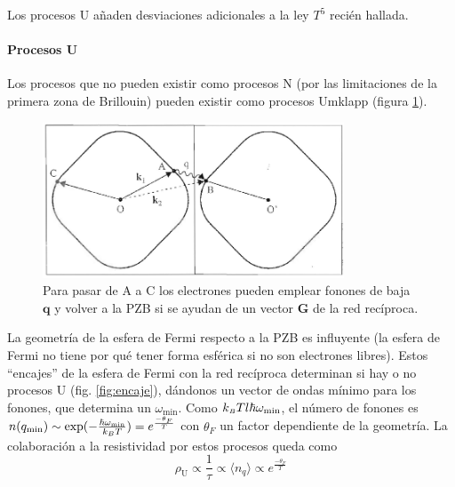 Los procesos U añaden desviaciones adicionales a la ley $T^5$ recién
hallada.

\paragraph{Procesos U}
Los procesos que no pueden existir como procesos N (por las
limitaciones de la primera zona de Brillouin) pueden existir como
procesos Umklapp (figura \ref{fig:uprocess}).

\begin{figure}
  \centering
  \includegraphics[width=0.8\textwidth]{figures/uprocess.png}
  \caption{Para pasar de A a C los electrones pueden emplear fonones
    de baja $\mathbf{q}$ y volver a la PZB si se ayudan de un vector $\mathbf{G}$ de la
    red recíproca.}
  \label{fig:uprocess}
\end{figure}

La geometría de la esfera de Fermi respecto a la PZB es influyente (la
esfera de Fermi no tiene por qué tener forma esférica si no son electrones
libres). Estos ``encajes'' de la esfera de Fermi con la red recíproca
determinan si hay o no procesos U (fig. \ref{fig:encaje}), dándonos un
vector de ondas mínimo para los fonones, que determina un
$\omega_\text{min}$. Como $k_{\scriptscriptstyle{B}}  T l \hbar \omega_\text{min}$, el
número de fonones es $n(q_\text{min}) \sim
\exp(-\frac{\hbar\omega_\text{min}}{k_{\scriptscriptstyle{B}}  T}) =
e^{\frac{-\theta_F}{T}}$ con $\theta_F$ un factor dependiente de la
geometría. La colaboración a la resistividad por estos procesos queda como
\begin{equation}
  \rho_\text{U} \propto \frac{1}{\tau} \propto \langle n_q \rangle \propto
  e^{\frac{-\theta_F}{T}}
\end{equation}

